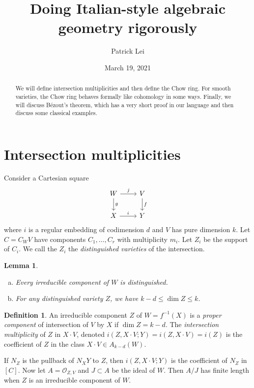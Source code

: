 \documentclass{amsart}
\title{Doing Italian-style algebraic geometry rigorously}
\author{Patrick Lei}
\date{March 19, 2021}
\newtheorem{lem}[thm]{Lemma}
\theoremstyle{definition}
\newtheorem{defn}[thm]{Definition}
\theoremstyle{remark}
\theoremstyle{plain}
\theoremstyle{definition}
\theoremstyle{remark}
\newcommand{\msc}[1]{\mathscr{#1}}
\begin{document}
    
\maketitle

\begin{abstract}
    We will define intersection multiplicities and then define the Chow ring. For smooth varieties, the Chow ring behaves formally like cohomology in some ways. Finally, we will discuss B\'ezout's theorem, which has a very short proof in our language and then discuss some classical examples.
\end{abstract}

\section{Intersection multiplicities}%
\label{sec:intersection_multiplicities}

Consider a Cartesian square
\begin{equation*}
\begin{tikzcd}
    W \ar{r}{j} \ar{d}{g} & V \ar{d}{f} \\
    X \ar{r}{i} & Y
\end{tikzcd}
\end{equation*}
where $i$ is a regular embedding of codimension $d$ and $V$ has pure dimension $k$. Let $C = C_W V$ have components $C_1, \ldots, C_r$ with multiplicity $m_i$. Let $Z_i$ be the support of $C_i$. We call the $Z_i$ the \textit{distinguished varieties} of the intersection.

\begin{lem}\leavevmode
    \begin{enumerate}[(a)]
        \item Every irreducible component of $W$ is distinguished.
        \item For any distinguished variety $Z$, we have $k-d \leq \dim Z \leq k$.
    \end{enumerate}
\end{lem}

\begin{defn}
    An irreducible component $Z$ of $W = f^{-1}(X)$ is a \textit{proper component} of intersection of $V$ by $X$ if $\dim Z = k-d$. The \textit{intersection multiplicity} of $Z$ in $X \cdot V$, denoted $i(Z, X \cdot V; Y) = i(Z, X \cdot V) = i(Z)$ is the coefficient of $Z$ in the class $X \cdot V \in A_{k-d}(W)$. 
\end{defn}

If $N_Z$ is the pullback of $N_X Y$ to $Z$, then $i(Z,X\cdot V; Y)$ is the coefficient of $N_Z$ in $[C]$. Now let $A = \msc{O}_{Z,V}$ and $J \subset A$ be the ideal of $W$. Then $A/J$ has finite length when $Z$ is an irreducible component of $W$.
\end{document}
